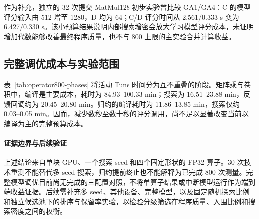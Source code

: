 \begin{table}[t]
\centering
\caption{全部 12 组活动 Tune 阶段成本（min）。测量与反馈包含 runner 调度和数值检查；模型更新包含在回调中，不重复相加。总调优不含 Tune 前准备、独立重测和接续状态重建，归约按实际终止点统计；四舍五入可能造成小计差异。}
\label{tab:operator800-phases}
\small
\setlength{\tabcolsep}{4pt}

\end{table}

作为补充，独立的 32 次提交 MatMul128 初步实验曾比较 GA1/GA4：C 的模型评分输入由 512 增至 1280，D 均为 64；C/D 评分时间从 2.561/0.333 s 变为 6.427/0.330 s。该小预算结果说明内部搜索增密会放大学习模型评分成本，未证明增加代数能够改善最终程序质量，也不与 800 上限的主实验合并计算收益。

\subsection{完整调优成本与实验范围}
\label{sec:cost-and-feedback}
表~\ref{tab:operator800-phases} 将活动 Tune 时间分为互不重叠的阶段。矩阵乘与卷积中，编译是主要成本，耗时为 84.93--100.33 min；搜索为 16.51--23.88 min，反馈回调约为 20.45--20.80 min。归约的编译耗时为 11.86--13.85 min，搜索仅约 0.03--0.05 min。因而，减少数秒至数十秒的评分调用，尚不足以显著改变当前以编译为主的完整预算成本。

\paragraph{证据边界与后续验证}
\label{sec:end-to-end}
上述结论来自单块 GPU、一个搜索 seed 和四个固定形状的 FP32 算子。30 次技术重测不能替代多 seed 搜索，归约提前终止也不能解释为已完成 800 次测量。完整模型调优目前尚无完成的三配置对照，不将单算子结果或中断模型运行作为端到端收益证据。后续需补充多 seed、其他设备、完整模型，以及固定随机探索比例和独立候选池下的排序与保留率实验，以检验分级筛选在程序质量、入围比例和搜索密度之间的权衡。
\FloatBarrier
\endgroup
